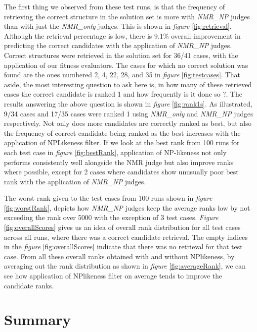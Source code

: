 \documentclass[10pt]{bmc_article}
\newenvironment{bmcformat}{\begin{raggedright}\baselineskip20pt\sloppy\setboolean{publ}{false}}{\end{raggedright}\baselineskip20pt\sloppy}
\begin{document}
\begin{bmcformat}
The first thing we observed from these test runs, is that the frequency of retrieving the correct structure in the solution set is more with \emph {NMR\_NP} judges than with just the \emph {NMR\_only} judges. This is shown in \emph{figure} \ref{fig:retrieval}. Although the retrieval percentage is low, there is 9.1\% overall improvement in predicting the correct candidates with the application of \emph {NMR\_NP} judges. Correct structures were retrieved in the solution set for 36/41 cases, with the application of our fitness evaluators. The cases for which no correct solution was found are the ones numbered 2, 4, 22, 28, and 35 in \emph{figure} \ref{fig:testcases}. That aside, the most interesting question to ask here is, in how many of these retrieved cases the correct candidate is ranked 1 and how frequently is it done so ?. The results answering the above question is shown in \emph{figure} \ref{fig:rank1s}. As illustrated, 9/34 cases and 17/35 cases were ranked 1 using \emph {NMR\_only} and \emph {NMR\_NP}  judges respectively. Not only does more candidates are correctly ranked as best, but also the frequency of correct candidate being ranked as the best increases with the application of NPLikeness filter. If we look at the best rank from 100 runs for each test case in \emph{figure} \ref{fig:bestRank}, application of NP-likeness not only performs consistently well alongside the NMR judge but also improve ranks where possible, except for 2 cases where candidates show unusually poor best rank with the application of \emph{NMR\_NP} judges.

The worst rank given to the test cases from 100 runs shown in \emph{figure} \ref{fig:worstRank}, depicts how \emph{NMR\_NP} judges keep the average ranks low by not exceeding the rank over 5000 with the exception of 3 test cases. \emph{Figure} \ref{fig:overallScores} gives us an idea of overall rank distribution for all test cases across all runs, where there was a correct candidate retrieval. The empty indices in the \emph{figure}  \ref{fig:overallScores}  indicate that there was no retrieval for that test case. From all these overall ranks obtained with and without NPlikeness, by averaging out the rank distribution as shown in \emph{figure} \ref{fig:averageRank}, we can see how application of  NPlikeness filter on average tends to improve the candidate ranks. 



\section*{Summary}


\end{bmcformat}
\end{document}
